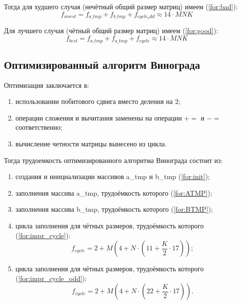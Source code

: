 Тогда для худшего случая (нечётный общий размер матриц) имеем (\ref{for:bad}):
\begin{equation}
	\label{for:bad}
	f_{worst} =  f_{a\_tmp} + f_{b\_tmp} + f_{cycle_odd}\approx 14 \cdot MNK
\end{equation}

Для лучшего случая (чётный общий размер матриц) имеем (\ref{for:good}):
\begin{equation}
	\label{for:good}
f_{best} =  f_{a\_tmp} + f_{a\_tmp} + f_{cycle} \approx 14 \cdot MNK
\end{equation}


\subsection{Оптимизированный алгоритм Винограда}

Оптимизация заключается в:
\begin{enumerate}[label=\arabic*)]
    \item использовании побитового сдвига вместо деления на 2;
    \item операции сложения и вычитания заменены на операции $+=$ и $-=$ соответственно;
    \item вычисление четности матрицы вынесено из цикла.
    \newline
\end{enumerate}

Тогда трудоемкость оптимизированного алгоритма Винограда состоит из:

\begin{enumerate}[label=\arabic*)]
	\item создания и инициализации массивов a\_tmp и b\_tmp (\ref{for:init});
	
	\item заполнения массива a\_tmp, трудоёмкость которого (\ref{for:ATMP});
	
	\item заполнения массива b\_tmp, трудоёмкость которого (\ref{for:BTMP});
	
	\item цикла заполнения для чётных размеров, трудоёмкость которого (\ref{for:impr_cycle}):
	\begin{equation}
		\label{for:impr_cycle}
		f_{cycle} = 2 + M (4 + N \cdot (11 + \frac{K}{2} \cdot 17));
	\end{equation}
	
	\item цикла заполнения для чётных размеров, трудоёмкость которого (\ref{for:impr_cycle_odd}):
	\begin{equation}
		\label{for:impr_cycle_odd}
		f_{cycle} = 2 + M (4 + N \cdot (22 + \frac{K}{2} \cdot 17)).
	\end{equation}
\end{enumerate}

